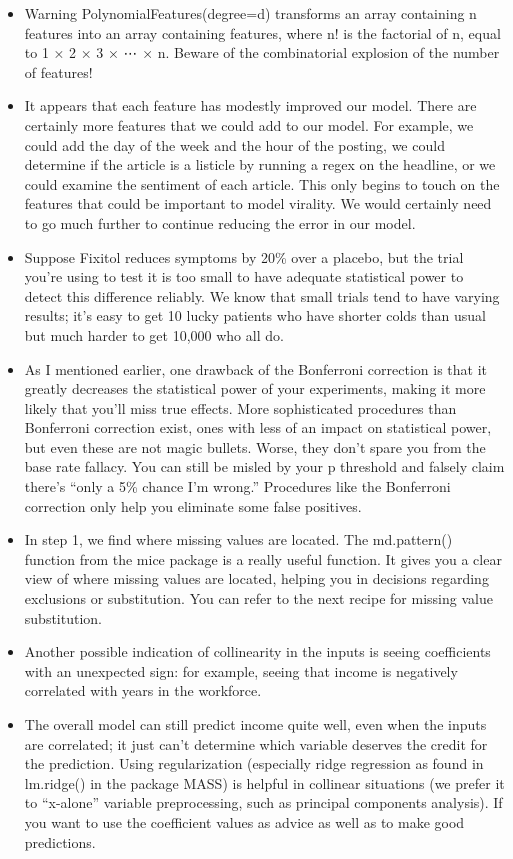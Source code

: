 \documentclass[]{book}
\begin{document}
\begin{itemize}
\item
  Warning PolynomialFeatures(degree=d) transforms an array containing n features into an array containing features, where n! is the factorial of n, equal to 1 × 2 × 3 × ⋯ × n. Beware of the combinatorial explosion of the number of features!
\item
  It appears that each feature has modestly improved our model. There are certainly more features that we could add to our model. For example, we could add the day of the week and the hour of the posting, we could determine if the article is a listicle by running a regex on the headline, or we could examine the sentiment of each article. This only begins to touch on the features that could be important to model virality. We would certainly need to go much further to continue reducing the error in our model.
\item
  Suppose Fixitol reduces symptoms by 20\% over a placebo, but the trial you're using to test it is too small to have adequate statistical power to detect this difference reliably. We know that small trials tend to have varying results; it's easy to get 10 lucky patients who have shorter colds than usual but much harder to get 10,000 who all do.
\item
  As I mentioned earlier, one drawback of the Bonferroni correction is that it greatly decreases the statistical power of your experiments, making it more likely that you'll miss true effects. More sophisticated procedures than Bonferroni correction exist, ones with less of an impact on statistical power, but even these are not magic bullets. Worse, they don't spare you from the base rate fallacy. You can still be misled by your p threshold and falsely claim there's ``only a 5\% chance I'm wrong.'' Procedures like the Bonferroni correction only help you eliminate some false positives.
\item
  In step 1, we find where missing values are located. The md.pattern() function from the mice package is a really useful function. It gives you a clear view of where missing values are located, helping you in decisions regarding exclusions or substitution. You can refer to the next recipe for missing value substitution.
\item
  Another possible indication of collinearity in the inputs is seeing coefficients with an unexpected sign: for example, seeing that income is negatively correlated with years in the workforce.
\item
  The overall model can still predict income quite well, even when the inputs are correlated; it just can't determine which variable deserves the credit for the prediction. Using regularization (especially ridge regression as found in lm.ridge() in the package MASS) is helpful in collinear situations (we prefer it to ``x-alone'' variable preprocessing, such as principal components analysis). If you want to use the coefficient values as advice as well as to make good predictions.

\end{itemize}
\end{document}
